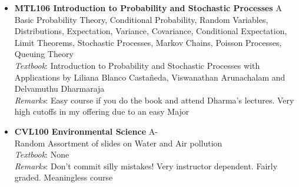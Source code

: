 \documentclass[a4paper]{article}
\begin{document}
\begin{itemize}
    \\
    \textit{Textbook}: LLM Book
    \\
    \textit{Remarks}: Don't commit silly mistakes and solve LLM Book's problems. Previous offerings' tutorials and Rohit Vaish's problems are another excellent source.
    \item \textbf{MTL106 Introduction to Probability and Stochastic Processes} {\color{red}A}
    \\
    Basic Probability Theory, Conditional Probability, Random Variables, Distributions, Expectation, Variance, Covariance, Conditional Expectation, Limit Theorems, Stochastic Processes, Markov Chains, Poisson Processes, Queuing Theory
    \\
    \textit{Textbook}: Introduction to Probability and Stochastic Processes with Applications by Liliana Blanco Castañeda, Viswanathan Arunachalam and Delvamuthu Dharmaraja
    \\
    \textit{Remarks}: Easy course if you do the book and attend Dharma's lectures. Very high cutoffs in my offering due to an easy Major
    \item \textbf{CVL100 Environmental Science} {\color{red}A-}
    \\
    Random Assortment of slides on Water and Air pollution
    \\
    \textit{Textbook}: None
    \\
    \textit{Remarks}: Don't commit silly mistakes! Very instructor dependent. Fairly graded. Meaningless course
    
\end{itemize}
\newpage
\end{document}
